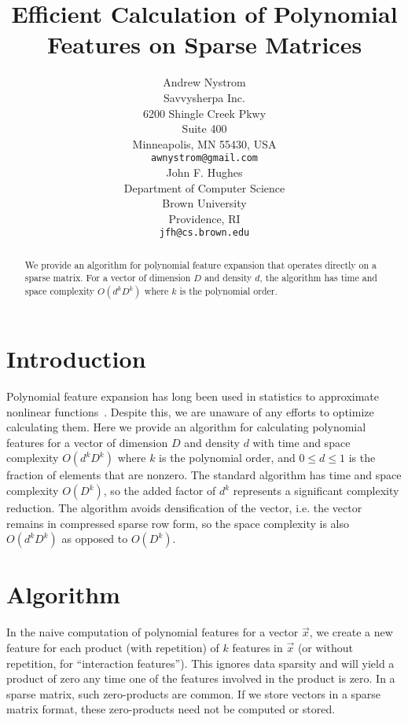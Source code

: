 \documentclass{article} %
\title{Efficient Calculation of Polynomial Features on Sparse Matrices}
\author{Andrew Nystrom \\
Savvysherpa Inc.\\
6200 Shingle Creek Pkwy \\
Suite 400 \\
Minneapolis, MN 55430, USA \\
\texttt{awnystrom@gmail.com} \\
\And
John F. Hughes \\
Department of Computer Science \\
Brown University \\
Providence, RI \\
\texttt{jfh@cs.brown.edu} \\
}
\begin{document}
\maketitle

\begin{abstract}
We provide an algorithm for polynomial feature expansion that operates directly on a sparse matrix.
For a vector of dimension $D$ and density $d$, the algorithm has time and space complexity $O(d^kD^k)$ where $k$ is the polynomial order.
\end{abstract}


\section{Introduction}

Polynomial feature expansion has long been used in statistics to approximate nonlinear functions~\cite{gergonne1974application, smith1918standard}.
Despite this, we are unaware of any efforts to optimize calculating them.
Here we provide an algorithm for calculating polynomial features for a vector of dimension $D$ and density $d$ with time and space complexity $O(d^kD^k)$ where $k$ is the polynomial order, and $0 \le d \le 1$ is the fraction of elements that are nonzero.
The standard algorithm has time and space complexity $O(D^k)$, so the added factor of $d^k$ represents a significant complexity reduction.
The algorithm avoids densification of the vector, i.e. the vector remains in compressed sparse row form, so the space complexity is also $O(d^kD^k)$ as opposed to $O(D^k)$. 

\section{Algorithm}
In the naive computation of polynomial features for a vector $\vec{x}$, we create a new feature for each product (with repetition) of $k$ features in $\vec{x}$ (or without repetition, for ``interaction features'').
This ignores data sparsity and will yield a product of zero any time one of the features involved in the product is zero.
In a sparse matrix, such zero-products are common.
If we store vectors in a sparse matrix format, these zero-products need not be computed or stored. 
\end{document}
